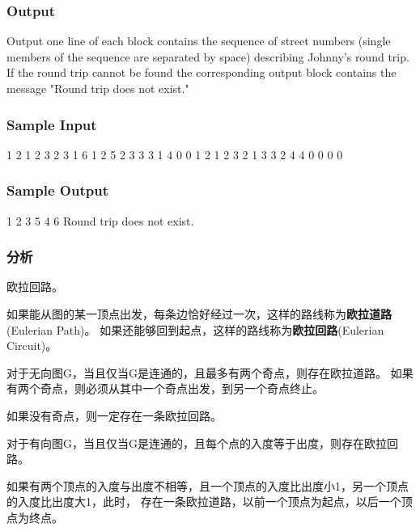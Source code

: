 \subsubsection{Output}
Output one line of each block contains the sequence of street numbers (single members of the sequence are separated by space) describing Johnny's round trip. If the round trip cannot be found the corresponding output block contains the message "Round trip does not exist."


\subsubsection{Sample Input}
\begin{Code}
1 2 1
2 3 2
3 1 6
1 2 5
2 3 3
3 1 4
0 0
1 2 1
2 3 2
1 3 3
2 4 4
0 0
0 0
\end{Code}

\subsubsection{Sample Output}
\begin{Code}
1 2 3 5 4 6 
Round trip does not exist.
\end{Code}

\subsubsection{分析}
欧拉回路。

如果能从图的某一顶点出发，每条边恰好经过一次，这样的路线称为\textbf{欧拉道路}(Eulerian Path)。
如果还能够回到起点，这样的路线称为\textbf{欧拉回路}(Eulerian Circuit)。

对于无向图G，当且仅当G是连通的，且最多有两个奇点，则存在欧拉道路。
如果有两个奇点，则必须从其中一个奇点出发，到另一个奇点终止。

如果没有奇点，则一定存在一条欧拉回路。

对于有向图G，当且仅当G是连通的，且每个点的入度等于出度，则存在欧拉回路。

如果有两个顶点的入度与出度不相等，且一个顶点的入度比出度小1，另一个顶点的入度比出度大1，此时，
存在一条欧拉道路，以前一个顶点为起点，以后一个顶点为终点。



